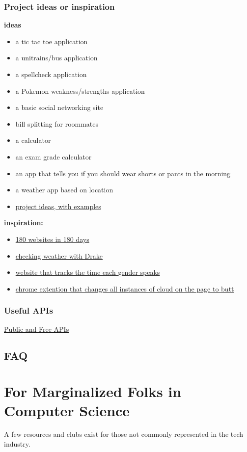 \documentclass{article}
\begin{document}
\subsubsection{Project ideas or inspiration}
\textbf{ideas}
\begin{itemize}
    \item a tic tac toe application
    \item a unitrains/bus application
    \item a spellcheck application
    \item a Pokemon weakness/strengths application
    \item a basic social networking site
    \item bill splitting for roommates
    \item a calculator
    \item an exam grade calculator 
    \item an app that tells you if you should wear shorts or pants in the morning
    \item a weather app based on location
    \item \href{https://github.com/karan/Projects}{project ideas, with examples}
\end{itemize}
\textbf{inspiration:}
\begin{itemize}
    \item \href{https://jenniferdewalt.com/}{180 websites in 180 days}
    \item \href{http://drakeweather.com/}{checking weather with Drake}
    \item \href{https://github.com/cathydeng/are-men-talking-too-much}{website that tracks the time each gender speaks}
    \item \href{https://github.com/panicsteve/cloud-to-butt}{chrome extention that changes all instances of cloud on the page to butt}
\end{itemize}
\subsubsection{Useful APIs}
\href{https://github.com/toddmotto/public-apis}{Public and Free APIs}
\subsection{FAQ}
\newpage
\section {For Marginalized Folks in Computer Science}
\hspace{0.5cm} A few resources and clubs exist for those not commonly represented in the tech industry. 
\end{document}
